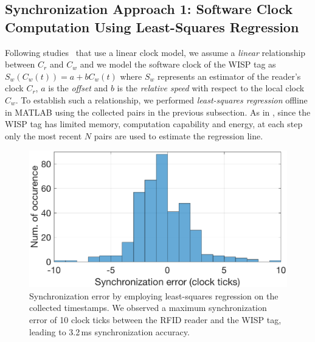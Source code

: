 \documentclass[journal,draftcls,onecolumn,12pt,twoside]{IEEEtranTCOM}
\begin{document}
\subsection{Synchronization Approach 1: Software Clock Computation Using  Least-Squares Regression}

Following studies~\cite{Maroti2004,Schmid:2010,Lenzen:2015,TATS:2016} that use a linear clock model, we assume a \emph{linear} relationship between $C_r$ and $C_w$ and we model the software clock of the WISP tag as $S_w(C_w(t)) = a + b C_w(t)$ where $S_w$ represents an estimator of the reader's clock $C_r$, $a$ is the \emph{offset} and $b$ is the \emph{relative speed} with respect to the local clock $C_w$. To establish such a relationship, we performed \emph{least-squares regression} offline in MATLAB using the collected pairs in the previous subsection. As in \cite{Maroti2004}, since the WISP tag has limited memory, computation capability and energy, at each step only the most recent $N$ pairs are used to estimate the regression line. 

\begin{figure}
\centering
\includegraphics[scale=0.35]{figures/least_squares.eps}
\caption{\label{fig:least-squares}Synchronization error by employing least-squares regression on the collected timestamps. We observed a maximum synchronization error of 10 clock ticks between the RFID reader and the WISP tag, leading to 3.2\,ms synchronization accuracy.}
\end{figure}
\end{document}
